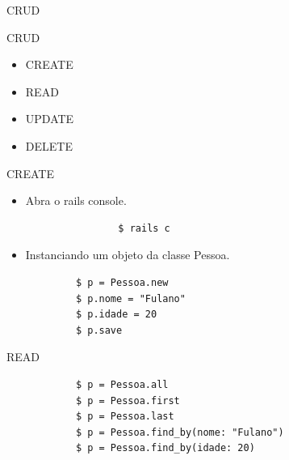 \documentclass{beamer}
\begin{document}

\begin{frame}[fragile]{CRUD}
	\begin{block} {\LARGE CRUD}
		\begin{itemize} \itemsep 2em
			\item{\LARGE CREATE}
			\item{\LARGE READ}
			\item{\LARGE UPDATE}
			\item{\LARGE DELETE}				
		\end{itemize}
	\end{block}
\end{frame}

\begin{frame}[fragile]{CREATE}
\begin{itemize} \itemsep 2em
\item{\Large Abra o rails console.}
	\begin{block}{}
				\begin{verbatim}			
				$ rails c
				\end{verbatim}
				\end{block}
\item{\Large Instanciando um objeto da classe Pessoa.}
\end{itemize}
	\begin{block}{}
			\begin{verbatim}			
			$ p = Pessoa.new
			$ p.nome = "Fulano"
			$ p.idade = 20
			$ p.save
			\end{verbatim}
			\end{block}
\end{frame}

\begin{frame}[fragile]{READ }
	\begin{block}{}
			\begin{verbatim}			
			$ p = Pessoa.all
			$ p = Pessoa.first
			$ p = Pessoa.last
			$ p = Pessoa.find_by(nome: "Fulano")
			$ p = Pessoa.find_by(idade: 20)
			\end{verbatim}
			\end{block}
\end{frame}
\end{document}
